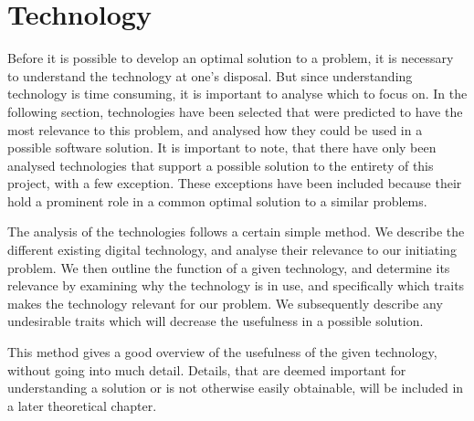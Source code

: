 
\section{Technology} \label{tech}


Before it is possible to develop an optimal solution to a problem, it is necessary to understand the technology at one's disposal. But since understanding technology is time consuming, it is important to analyse which to focus on. In the following section, technologies have been selected that were predicted to have the most relevance to this problem, and analysed how they could be used in a possible software solution. It is important to note, that there have only been analysed technologies that support a possible solution to the entirety of this project, with a few exception. These exceptions have been included because their hold a prominent role in a common optimal solution to a similar problems.

The analysis of the technologies follows a certain simple method. We describe the different existing digital technology, and analyse their relevance to our initiating problem. We then outline the function of a given technology, and determine its relevance by examining why the technology is in use, and specifically which traits makes the technology relevant for our problem. We subsequently describe any undesirable traits which will decrease the usefulness in a possible solution.

 \label{sub:techmethod}
This method gives a good overview of the usefulness of the given technology, without going into much detail. Details, that are deemed important for understanding a solution or is not otherwise easily obtainable, will be included in a later theoretical chapter.


